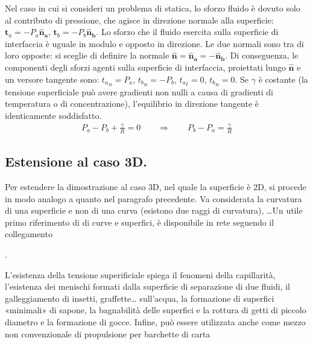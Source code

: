 \documentclass[letterpaper,10pt,italian]{jupyterBook}
\begin{document}
\sphinxAtStartPar
Nel caso in cui si consideri un problema di statica, lo sforzo 
fluido è dovuto solo al contributo di pressione, che agisce in direzione
normale alla superficie: \(\mathbf{t}_a = -P_a \mathbf{\hat{n}_a}\),
\(\mathbf{t}_b = -P_b \mathbf{\hat{n}_b}\). Lo sforzo che il fluido esercita sulla
superficie di interfaccia è uguale in modulo e opposto in direzione. Le
due normali sono tra di loro opposte: si sceglie di definire la normale
\(\mathbf{\hat{n}} = \mathbf{\hat{n}_a} = -\mathbf{\hat{n}_b}\). Di conseguenza, le
componenti degli sforzi agenti sulla superficie di interfaccia,
proiettati lungo \(\mathbf{\hat{n}}\) e un versore tangente sono:
\({{t_a}_n} = P_a\), \({{t_b}_n} = - P_b\), \({{t_a}_t} = 0\),
\({{t_b}_n} = 0\). Se \(\gamma\) è costante (la tensione superficiale può
avere gradienti non nulli a causa di gradienti di temperatura o di
concentrazione), l’equilibrio in direzione tangente è identicamente
soddisfatto.
\begin{equation*}
\begin{split}P_a - P_b + \frac{\gamma}{R} = 0 \qquad 
  \Rightarrow  \qquad 
   P_b - P_a = \frac{\gamma}{R}\end{split}
\end{equation*}

\subsection{Estensione al caso 3D.}
\label{\detokenize{polimi/fluidmechanics-ita/template/capitoli/02_tensSup/03teoria:estensione-al-caso-3d}}
\sphinxAtStartPar
Per estendere la dimostrazione al caso 3D, nel quale la superficie è 2D,
si procede in modo analogo a quanto nel paragrafo precedente. Va
considerata la curvatura di una superficie e non di una curva (esistono
due raggi di curvatura), …Un utile primo riferimento di  di curve e superfici, è disponibile in rete seguendo il
collegamento

\sphinxAtStartPar
{}.

\sphinxAtStartPar
L’esistenza della tensione superificiale spiega il fenomeni della
capillarità, l’esistenza dei menischi formati dalla superficie di
separazione di due fluidi, il galleggiamento di insetti, graffette…
sull’acqua, la formazione di superfici «minimali» di sapone, la
bagnabilità delle superfici e la rottura di getti di piccolo diametro e
la formazione di gocce. Infine, può essere utilizzata anche come mezzo
non convenzionale di propulsione per barchette di carta
\end{document}
